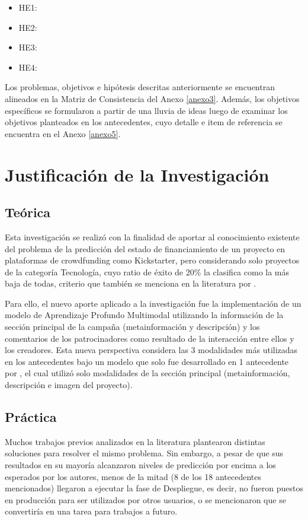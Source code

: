\begin{itemize}
	\item HE1: \Hone
	\item HE2: \Htwo
	\item HE3: \Hthree
	\item HE4: \Hfour
\end{itemize}

Los problemas, objetivos e hipótesis descritas anteriormente se encuentran alineados en la Matriz de Consistencia del Anexo \ref{anexo3}. Además, los objetivos específicos se formularon a partir de una lluvia de ideas luego de examinar los objetivos planteados en los antecedentes, cuyo detalle e item de referencia se encuentra en el Anexo \ref{anexo5}.

\section{Justificación de la Investigación}

\subsection{Teórica}
Esta investigación se realizó con la finalidad de aportar al conocimiento existente del problema de la predicción del estado de financiamiento de un proyecto en plataformas de crowdfunding como Kickstarter, pero considerando solo proyectos de la categoría Tecnología, cuyo ratio de éxito de 20\% la clasifica como la más baja de todas, criterio que también se menciona en la literatura por \cite{pr_lee2018contentDL}.

Para ello, el nuevo aporte aplicado a la investigación fue la implementación de un modelo de Aprendizaje Profundo Multimodal utilizando la información de la sección principal de la campaña (metainformación y descripción) y los comentarios de los patrocinadores como resultado de la interacción entre ellos y los creadores. Esta nueva perspectiva considera las 3 modalidades más utilizadas en los antecedentes bajo un modelo que solo fue desarrollado en 1 antecedente por \cite{pr_cheng2019deeplearning}, el cual utilizó solo modalidades de la sección principal (metainformación, descripción e imagen del proyecto).

\subsection{Práctica}
Muchos trabajos previos analizados en la literatura plantearon distintas soluciones para resolver el mismo problema. Sin embargo, a pesar de que sus resultados en su mayoría alcanzaron niveles de predicción por encima a los esperados por los autores, menos de la mitad (8 de los 18 antecedentes mencionados) llegaron a ejecutar la fase de Despliegue, es decir, no fueron puestos en producción para ser utilizados por otros usuarios, o se mencionaron que se convertiría en una tarea para trabajos a futuro.

